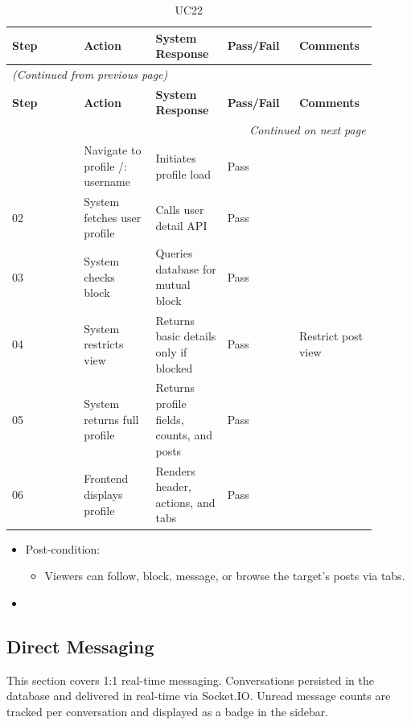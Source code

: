 \begin{longtable}{|p{0.18\linewidth}|p{0.18\linewidth}|p{0.18\linewidth}|p{0.18\linewidth}|p{0.18\linewidth}|}
\caption{UC22} \label{tab:38} \\
\hline
\textbf{Step} & \textbf{Action} & \textbf{System Response} & \textbf{Pass/Fail} & \textbf{Comments} \\
\hline
\endfirsthead
\multicolumn{5}{l}{\textit{(Continued from previous page)}} \\
\hline
\textbf{Step} & \textbf{Action} & \textbf{System Response} & \textbf{Pass/Fail} & \textbf{Comments} \\
\hline
\endhead
\hline \multicolumn{5}{r}{\textit{Continued on next page}} \\
\endfoot
\hline
\endlastfoot
01 & Navigate to profile /: username & Initiates profile load & Pass &  \\
\hline
02 & System fetches user profile & Calls user detail API & Pass &  \\
\hline
03 & System checks block & Queries database for mutual block & Pass &  \\
\hline
04 & System restricts view & Returns basic details only if blocked & Pass & Restrict post view \\
\hline
05 & System returns full profile & Returns profile fields, counts, and posts & Pass &  \\
\hline
06 & Frontend displays profile & Renders header, actions, and tabs & Pass &  \\
\hline
\end{longtable}

\begin{itemize}
  \item Post-condition:
\begin{itemize}
  \item Viewers can follow, block, message, or browse the target's posts via tabs.
\end{itemize}
  \item 
\end{itemize}

\subsection{Direct Messaging}

This section covers 1:1 real-time messaging. Conversations persisted in the database and delivered in real-time via Socket.IO. Unread message counts are tracked per conversation and displayed as a badge in the sidebar.

